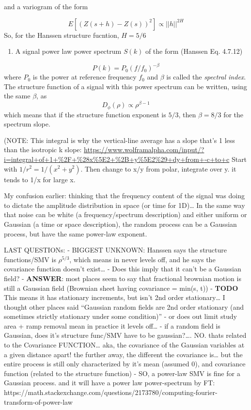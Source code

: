 \documentclass{utexasthesis}
\begin{document}
and a variogram of the form

\[E[(Z(s + h) - Z(s))^2] \propto ||h||^{2H}\] So, for the Hanssen
structure fucntion, \(H=5/6\)

\begin{enumerate}
\def\labelenumi{\arabic{enumi}.}
\setcounter{enumi}{2}

\item
  A signal power law power spectrum \(S(k)\) of the form (Hanssen Eq.
  4.7.12)
\end{enumerate}

\[P(k) = P_0 \left(f/f_0\right)^{-\beta}\] where \(P_0\) is the power at
reference frequency \(f_0\) and \(\beta\) is called the \emph{spectral
index}. The structure function of a signal with this power spectrum can
be written, using the same \(\beta\), as
\[D_{\phi}(\rho) \propto \rho^{\beta-1}\] which means that if the
structure function exponent is \(5/3\), then \(\beta=8/3\) for the
spectrum slope.


(NOTE: This integral is why the vertical-line average has a slope that's 1 less than the isotropic k slope: \url{https://www.wolframalpha.com/input/?i=integral+of+1+%2F+%28x%5E2+%2B+y%5E2%29+dy+from+-c+to+c}
Start with $1 / r^2 = 1/(x^2 + y^2)$.
Then change to x/y from polar, integrate over y. it tends to 1/x for large x.

My confusion earlier: thinking that the frequency content of the signal
was doing to dictate the amplitude distribution in space (or time for
1D)\ldots{} In the same way that noise can be white (a
frequency/spectrum description) and either uniform or Gaussian (a time
or space description), the random process can be a Gaussian process, but
have the same power-law exponent.

LAST QUESTIONs: - BIGGEST UNKNOWN: Hanssen says the structure
functions/SMV is \(\rho^{5/3}\), which means in never levels off, and he
says the covariance function doesn't exist\ldots{} - Does this imply
that it can't be a Gaussian field? - \textbf{ANSWER}: most places seem
to say that fractional brownian motion is still a Gaussian field
(Brownian sheet having covariance = min(s, t)) - \textbf{TODO} This
means it has stationary increments, but isn't 2nd order
stationary\ldots{} I thought other places said ``Gaussian random fields
are 2nd order stationary (and sometimes strictly stationary under some
condition)'' - or does out limit study area + ramp removal mean in
practice it levels off\ldots{} - if a random field is Gaussian, does
it's structure func/SMV have to be gaussian?\ldots{}. NO. thats related
to the Covariance FUNCTION\ldots{} aka, the covariance of the Gaussian
variables at a given distance apart! the further away, the different the
covariance is\ldots{} but the entire process is still only characterized
by it's mean (assumed 0), and covariance function (related to the
structure function) - SO, a power-law SMV is fine for a Gaussian
process. and it will have a power law power-spectrum by FT:
https://math.stackexchange.com/questions/2173780/computing-fourier-transform-of-power-law
\end{document}
